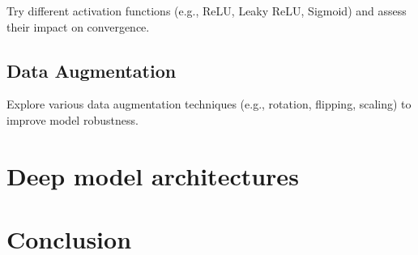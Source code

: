 \documentclass[10pt,twocolumn,letterpaper]{article}
\begin{document}
Try different activation functions (e.g., ReLU, Leaky ReLU, Sigmoid) and assess their impact on convergence.

\subsection{Data Augmentation}

Explore various data augmentation techniques (e.g., rotation, flipping, scaling) to improve model robustness.


\section{Deep model architectures}
\label{sec:deep_model_arch}


\section{Conclusion}
\label{sec:conclusion}


{\small
  
  
}
\end{document}
